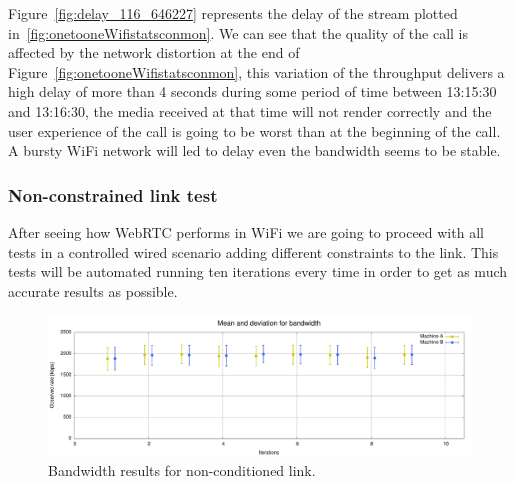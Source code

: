 Figure~\ref{fig:delay_116_646227} represents the delay of the stream plotted in~\ref{fig:onetooneWifistatsconmon}. We can see that the quality of the call is affected by the network distortion at the end of Figure~\ref{fig:onetooneWifistatsconmon}, this variation of the throughput delivers a high delay of more than 4 seconds during some period of time between 13:15:30 and 13:16:30, the media received at that time will not render correctly and the user experience of the call is going to be worst than at the beginning of the call. A bursty WiFi network will led to delay even the bandwidth seems to be stable.

\subsubsection{Non-constrained link test}

After seeing how WebRTC performs in WiFi  we are going to proceed with all tests in a controlled wired scenario adding different constraints to the link. This tests will be automated running ten iterations every time in order to get as much accurate results as possible.
 
 \begin{figure}[h]
  \centering
    \includegraphics[width=1\textwidth]{./figures/no_ipfw.pdf}
      \caption[Bandwidth results for non-conditioned link]{Bandwidth results for non-conditioned link.}
	\label{fig:no_ipfw}
\end{figure}

